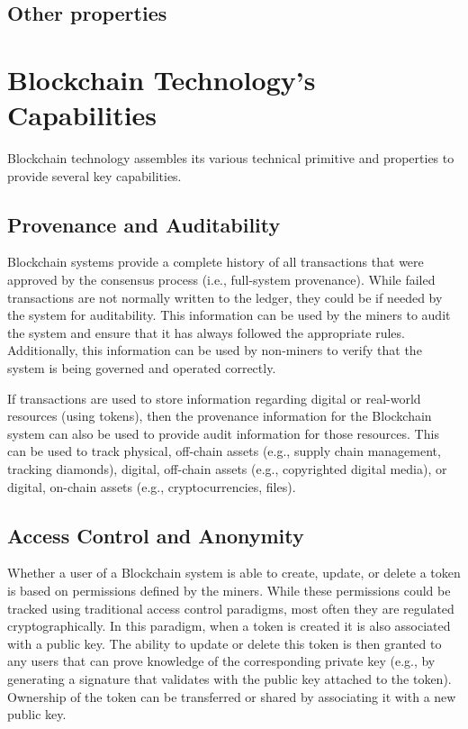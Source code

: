 \subsection{Other properties}

\section{Blockchain Technology's Capabilities}
\label{sec:capabilities}

Blockchain technology assembles its various technical primitive and properties to provide several key capabilities.

\subsection{Provenance and Auditability}
Blockchain systems provide a complete history of all transactions that were approved by the consensus process (i.e., full-system provenance).
While failed transactions are not normally written to the ledger, they could be if needed by the system for auditability.
This information can be used by the miners to audit the system and ensure that it has always followed the appropriate rules.
Additionally, this information can be used by non-miners to verify that the system is being governed and operated correctly.

If transactions are used to store information regarding digital or real-world resources (using tokens), then the provenance information for the Blockchain system can also be used to provide audit information for those resources.
This can be used to track physical, off-chain assets (e.g., supply chain management, tracking diamonds), digital, off-chain assets (e.g., copyrighted digital media), or digital, on-chain assets (e.g., cryptocurrencies, files).
 
\subsection{Access Control and Anonymity}
Whether a user of a Blockchain system is able to create, update, or delete a token is based on permissions defined by the miners.
While these permissions could be tracked using traditional access control paradigms, most often they are regulated cryptographically.
In this paradigm, when a token is created it is also associated with a public key.
The ability to update or delete this token is then granted to any users that can prove knowledge of the corresponding private key (e.g., by generating a signature that validates with the public key attached to the token).
Ownership of the token can be transferred or shared by associating it with a new public key.

